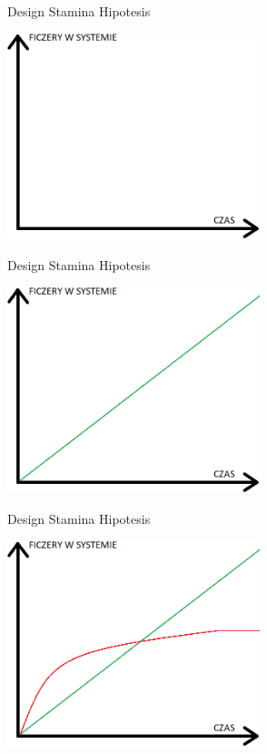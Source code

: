 \documentclass{beamer}
\begin{document}
\begin{frame}{Design Stamina Hipotesis}
\begin{center}
  	\includegraphics[height=6cm]{design_stability_hipotesis1.png}
\end{center}
\end{frame}

\begin{frame}{Design Stamina Hipotesis}
\begin{center}
  	\includegraphics[height=6cm]{design_stability_hipotesis2.png}
\end{center}
\end{frame}

\begin{frame}{Design Stamina Hipotesis}
\begin{center}
  	\includegraphics[height=6cm]{design_stability_hipotesis3.png}
\end{center}
\end{frame}
\end{document}

